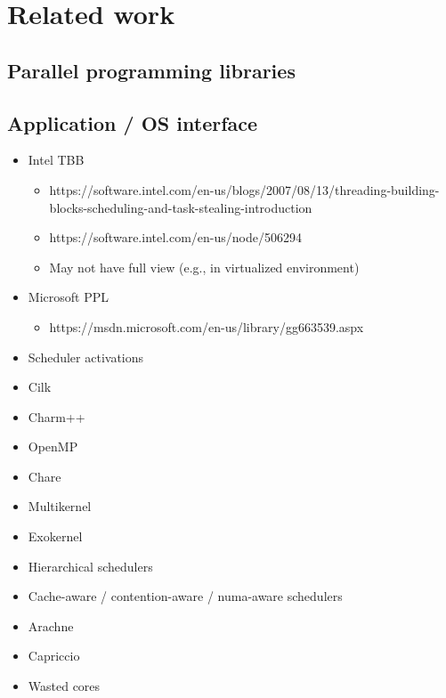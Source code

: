 \section{Related work}
\subsection{Parallel programming libraries}
\subsection{Application / OS interface}
\begin{itemize}
  \item Intel TBB \cite{contreras2008characterizing}
  \begin{itemize}
    \item https://software.intel.com/en-us/blogs/2007/08/13/threading-building-blocks-scheduling-and-task-stealing-introduction
    \item https://software.intel.com/en-us/node/506294
    \item May not have full view (e.g., in virtualized environment)
  \end{itemize}
  \item Microsoft PPL
  \begin{itemize}
    \item https://msdn.microsoft.com/en-us/library/gg663539.aspx
  \end{itemize}
  \item Scheduler activations \cite{anderson1992scheduler}
  \item Cilk \cite{blumofe1995cilk}
  \item Charm++
  \item OpenMP
  \item Chare
  \item Multikernel
  \item Exokernel
  \item Hierarchical schedulers
  \item Cache-aware / contention-aware / numa-aware schedulers
  \item Arachne
  \item Capriccio
  \item Wasted cores
\end{itemize}
